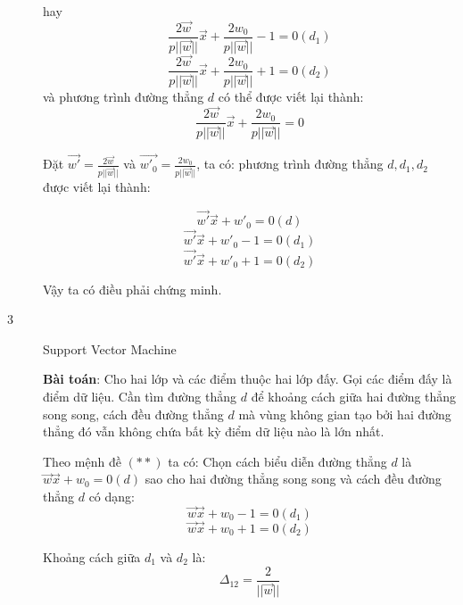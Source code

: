 \documentclass{article}
\begin{document}
\begin{description}
        hay 
        $$\frac{2\vec{w}}{p||\vec{w}||}\vec{x} + \frac{2w_0}{p||\vec{w}||} - 1 = 0 (d_1)$$
        $$\frac{2\vec{w}}{p||\vec{w}||}\vec{x} + \frac{2w_0}{p||\vec{w}||} + 1 = 0 (d_2)$$
        và phương trình đường thẳng $d$ có thể được viết lại thành:
        $$\frac{2\vec{w}}{p||\vec{w}||}\vec{x} + \frac{2w_0}{p||\vec{w}||} = 0$$

        Đặt $\vec{w'} = \frac{2\vec{w}}{p||\vec{w}||}$ và $\vec{w'_0} = \frac{2w_0}{p||\vec{w}||}$, ta có:
        phương trình đường thẳng $d, d_1, d_2$ được viết lại thành:

        $$\vec{w'}\vec{x} + w'_0 = 0 (d)$$
        $$\vec{w'}\vec{x} + w'_0 - 1 = 0 (d_1)$$
        $$\vec{w'}\vec{x} + w'_0 + 1 = 0 (d_2)$$

        Vậy ta có điều phải chứng minh.

        
        \item[3] Support Vector Machine
         
        \textbf{Bài toán}: Cho hai lớp và các điểm thuộc hai lớp đấy. 
        Gọi các điểm đấy là điểm dữ liệu.
        Cần tìm đường thẳng $d$ để khoảng cách giữa hai đường 
        thẳng song song, cách đều đường thẳng $d$ mà vùng
        không gian tạo bởi hai đường thẳng đó vẫn không 
        chứa bất kỳ điểm dữ liệu nào là lớn nhất.

        Theo mệnh đề $(**)$ ta có:\newline
        Chọn cách biểu diễn đường thẳng $d$ là $\vec{w}\vec{x} + w_0 = 0 (d)$
        sao cho hai đường thẳng song song và cách đều đường thẳng 
        $d$ có dạng:
        $$\vec{w}\vec{x} + w_0 - 1 = 0 (d_1)$$
        $$\vec{w}\vec{x} + w_0 + 1 = 0 (d_2)$$

        Khoảng cách giữa $d_1$ và $d_2$ là:
        $$\Delta _{12} = \frac{2}{||\vec{w}||}$$


        

        
        





    \end{description}
    
\end{document}
